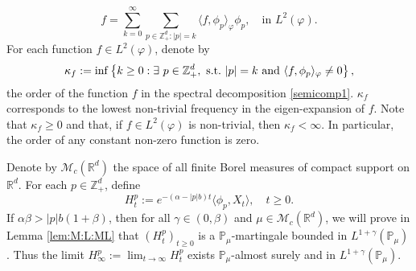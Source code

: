 \documentclass[12pt,a4paper]{amsart}
\theoremstyle{plain}
\theoremstyle{definition}
\numberwithin{equation}{section}
\begin{document}
\begin{equation}
\label{semicomp1}
f
=\sum_{k=0}^{\infty}\sum_{p\in \mathbb Z_+^d:|p|=k}\langle f, \phi_p \rangle_{\varphi} \phi_p
, \quad \text{in~} L^2(\varphi).
\end{equation}
For each function $f\in L^2(\varphi)$, denote by
\begin{equation}
  \kappa_f
  :=\inf \left \{k\geq 0: \exists ~ p\in \mathbb Z_+^d ,{\rm ~s.t.~}|p|=k {\rm ~and~}  \langle f, \phi_p \rangle_{\varphi}\neq 0\right \},
\end{equation}
the order of the function $f$ in the spectral decomposition \eqref{semicomp1}.
$\kappa_f$ corresponds to the lowest non-trivial frequency in the eigen-expansion of $f$.
Note that $ \kappa_f\geq 0$ and that, if $f\in L^2(\varphi)$ is non-trivial, then $\kappa_f<\infty$.
In particular, the order of any constant non-zero function is zero.

  Denote by $\mathcal M_c(\mathbb R^d)$ the space of all finite Borel measures of compact support on $\mathbb R^d$.
  For each $p\in \mathbb{Z}_+^d$, define
  \[
    H_t^p
    := e^{-(\alpha-|p|b)t}\langle\phi_p,X_t\rangle,
    \quad t\geq 0.
  \]
  If $\alpha\beta>|p|b(1+\beta)$, then for all $\gamma\in (0, \beta)$ and $\mu\in \mathcal M_c(\mathbb R^d)$, we will prove in Lemma \ref{lem:M:L:ML} that $(H_t^p)_{t\geq 0}$ is a $\mathbb{P}_{\mu}$-martingale bounded in $L^{1+\gamma}(\mathbb{P}_{\mu})$.
  Thus the limit $H^p_{\infty}:=\lim_{t\rightarrow \infty}H_t^p$ exists $\mathbb{P}_{\mu}$-almost surely and in $L^{1+\gamma}(\mathbb{P}_{\mu})$.
\end{document}
